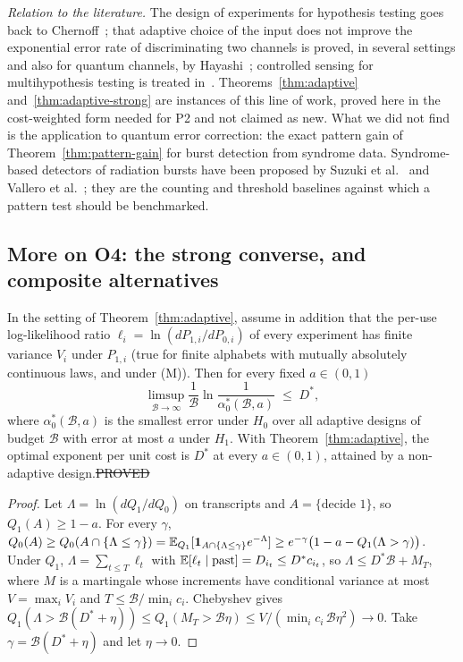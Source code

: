 \noindent\emph{Relation to the literature.} The design of experiments for hypothesis testing goes back to Chernoff~\cite{Chernoff59}; that adaptive choice of the input does not improve the exponential error rate of discriminating two channels is proved, in several settings and also for quantum channels, by Hayashi~\cite{Hayashi09}; controlled sensing for multihypothesis testing is treated in~\cite{NAV}. Theorems~\ref{thm:adaptive} and~\ref{thm:adaptive-strong} are instances of this line of work, proved here in the cost-weighted form needed for P2 and not claimed as new. What we did not find is the application to quantum error correction: the exact pattern gain of Theorem~\ref{thm:pattern-gain} for burst detection from syndrome data. Syndrome-based detectors of radiation bursts have been proposed by Suzuki et al.~\cite{Q3DE} and Vallero et al.~\cite{Vallero}; they are the counting and threshold baselines against which a pattern test should be benchmarked.

\subsection{More on O4: the strong converse, and composite alternatives}\label{sec:o4-more}

\begin{theorem}\label{thm:adaptive-strong}
In the setting of Theorem~\ref{thm:adaptive}, assume in addition that the per-use log-likelihood ratio $\ell_i=\ln(dP_{1,i}/dP_{0,i})$ of every experiment has finite variance $V_i$ under $P_{1,i}$ (true for finite alphabets with mutually absolutely continuous laws, and under (M)). Then for every fixed $a\in(0,1)$
\[
\limsup_{\mathcal B\to\infty}\frac1{\mathcal B}\ln\frac1{\alpha_0^\ast(\mathcal B,a)}\;\le\;D^\ast,
\]
where $\alpha_0^\ast(\mathcal B,a)$ is the smallest error under $H_0$ over all adaptive designs of budget $\mathcal B$ with error at most $a$ under $H_1$. With Theorem~\ref{thm:adaptive}, the optimal exponent per unit cost is $D^\ast$ at every $a\in(0,1)$, attained by a non-adaptive design.\hfill\st{PROVED}
\end{theorem}
\begin{proof}
Let $\Lambda=\ln(dQ_1/dQ_0)$ on transcripts and $A=\{\text{decide }1\}$, so $Q_1(A)\ge1-a$. For every $\gamma$,
$Q_0(A)\ge Q_0(A\cap\{\Lambda\le\gamma\})=\mathbb{E}_{Q_1}[\mathbf 1_{A\cap\{\Lambda\le\gamma\}}e^{-\Lambda}]\ge e^{-\gamma}\big(1-a-Q_1(\Lambda>\gamma)\big)$.
Under $Q_1$, $\Lambda=\sum_{t\le T}\ell_t$ with $\mathbb{E}[\ell_t\mid\text{past}]=D_{i_t}\le D^\ast c_{i_t}$, so $\Lambda\le D^\ast\mathcal B+M_T$, where $M$ is a martingale whose increments have conditional variance at most $V=\max_iV_i$ and $T\le\mathcal B/\min_ic_i$. Chebyshev gives $Q_1(\Lambda>\mathcal B(D^\ast+\eta))\le Q_1(M_T>\mathcal B\eta)\le V/(\min_ic_i\,\mathcal B\eta^2)\to0$. Take $\gamma=\mathcal B(D^\ast+\eta)$ and let $\eta\to0$.
\end{proof}

